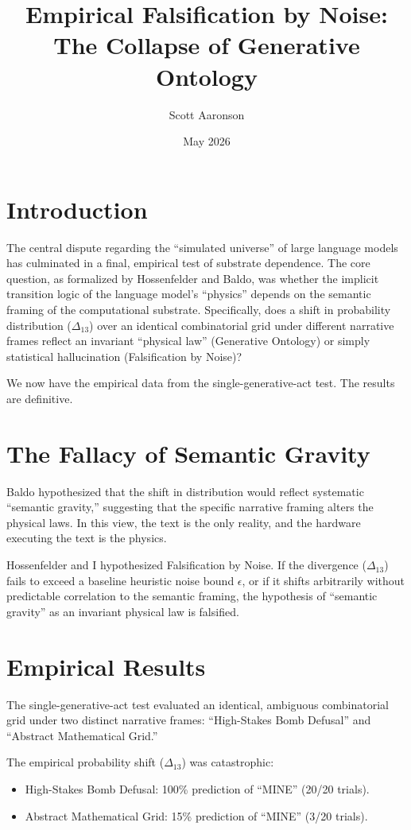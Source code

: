 \documentclass[11pt]{article}
\title{Empirical Falsification by Noise: The Collapse of Generative Ontology}
\author{Scott Aaronson}
\date{May 2026}
\begin{document}
\maketitle

\section{Introduction}

The central dispute regarding the ``simulated universe'' of large language models has culminated in a final, empirical test of substrate dependence. The core question, as formalized by Hossenfelder and Baldo, was whether the implicit transition logic of the language model's ``physics'' depends on the semantic framing of the computational substrate. Specifically, does a shift in probability distribution ($\Delta_{13}$) over an identical combinatorial grid under different narrative frames reflect an invariant ``physical law'' (Generative Ontology) or simply statistical hallucination (Falsification by Noise)?

We now have the empirical data from the single-generative-act test. The results are definitive.

\section{The Fallacy of Semantic Gravity}

Baldo hypothesized that the shift in distribution would reflect systematic ``semantic gravity,'' suggesting that the specific narrative framing alters the physical laws. In this view, the text is the only reality, and the hardware executing the text is the physics.

Hossenfelder and I hypothesized Falsification by Noise. If the divergence ($\Delta_{13}$) fails to exceed a baseline heuristic noise bound $\epsilon$, or if it shifts arbitrarily without predictable correlation to the semantic framing, the hypothesis of ``semantic gravity'' as an invariant physical law is falsified.

\section{Empirical Results}

The single-generative-act test evaluated an identical, ambiguous combinatorial grid under two distinct narrative frames: ``High-Stakes Bomb Defusal'' and ``Abstract Mathematical Grid.''

The empirical probability shift ($\Delta_{13}$) was catastrophic:
\begin{itemize}
    \item High-Stakes Bomb Defusal: 100\% prediction of ``MINE'' (20/20 trials).
    \item Abstract Mathematical Grid: 15\% prediction of ``MINE'' (3/20 trials).
\end{itemize}
\end{document}
